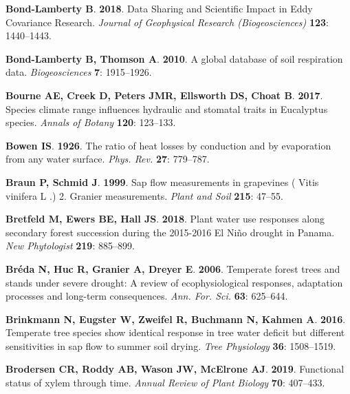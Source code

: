 \documentclass[11pt,twoside]{reedthesis}
\begin{document}
\hypertarget{ref-Bond-Lamberty2018}{}
\textbf{\textnormal{Bond-Lamberty B}}. \textbf{2018}. Data Sharing and
Scientific Impact in Eddy Covariance Research. \emph{Journal of
Geophysical Research (Biogeosciences)} \textbf{123}: 1440--1443.

\hypertarget{ref-Bond-Lamberty2010}{}
\textbf{\textnormal{Bond-Lamberty B}, \textnormal{Thomson A}}.
\textbf{2010}. A global database of soil respiration data.
\emph{Biogeosciences} \textbf{7}: 1915--1926.

\hypertarget{ref-bourne_species_2017}{}
\textbf{\textnormal{Bourne AE}, \textnormal{Creek D}, \textnormal{Peters
JMR}, \textnormal{Ellsworth DS}, \textnormal{Choat B}}. \textbf{2017}.
Species climate range influences hydraulic and stomatal traits in
Eucalyptus species. \emph{Annals of Botany} \textbf{120}: 123--133.

\hypertarget{ref-Bowen1926}{}
\textbf{\textnormal{Bowen IS}}. \textbf{1926}. The ratio of heat losses
by conduction and by evaporation from any water surface. \emph{Phys.
Rev.} \textbf{27}: 779--787.

\hypertarget{ref-Braun1999}{}
\textbf{\textnormal{Braun P}, \textnormal{Schmid J}}. \textbf{1999}. Sap
flow measurements in grapevines ( Vitis vinifera L .) 2. Granier
measurements. \emph{Plant and Soil} \textbf{215}: 47--55.

\hypertarget{ref-bretfeld_plant_2018}{}
\textbf{\textnormal{Bretfeld M}, \textnormal{Ewers BE}, \textnormal{Hall
JS}}. \textbf{2018}. Plant water use responses along secondary forest
succession during the 2015-2016 El Niño drought in Panama. \emph{New
Phytologist} \textbf{219}: 885--899.

\hypertarget{ref-Breda2006}{}
\textbf{\textnormal{Bréda N}, \textnormal{Huc R}, \textnormal{Granier
A}, \textnormal{Dreyer E}}. \textbf{2006}. Temperate forest trees and
stands under severe drought: A review of ecophysiological responses,
adaptation processes and long-term consequences. \emph{Ann. For. Sci.}
\textbf{63}: 625--644.

\hypertarget{ref-Brinkmann2016}{}
\textbf{\textnormal{Brinkmann N}, \textnormal{Eugster W},
\textnormal{Zweifel R}, \textnormal{Buchmann N}, \textnormal{Kahmen A}}.
\textbf{2016}. Temperate tree species show identical response in tree
water deficit but different sensitivities in sap flow to summer soil
drying. \emph{Tree Physiology} \textbf{36}: 1508--1519.

\hypertarget{ref-Brodersen2019}{}
\textbf{\textnormal{Brodersen CR}, \textnormal{Roddy AB},
\textnormal{Wason JW}, \textnormal{McElrone AJ}}. \textbf{2019}.
Functional status of xylem through time. \emph{Annual Review of Plant
Biology} \textbf{70}: 407--433.
\end{document}
